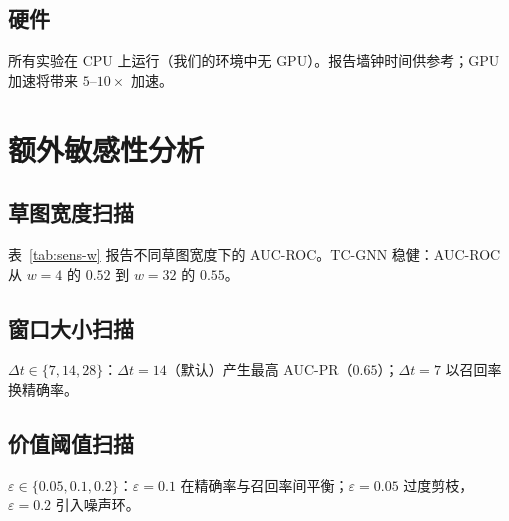 \documentclass[journal,onecolumn]{IEEEtran}
\newcommand{\eps}{\varepsilon}
\begin{document}
\subsection{硬件}

所有实验在 CPU 上运行（我们的环境中无 GPU）。报告墙钟时间供参考；GPU 加速将带来 $5$--$10\times$ 加速。

\section{额外敏感性分析}
\label{sec:appx-extra}

\subsection{草图宽度扫描}

表~\ref{tab:sens-w} 报告不同草图宽度下的 AUC-ROC。TC-GNN 稳健：AUC-ROC 从 $w=4$ 的 $0.52$ 到 $w=32$ 的 $0.55$。

\subsection{窗口大小扫描}

$\Delta t \in \{7, 14, 28\}$：$\Delta t = 14$（默认）产生最高 AUC-PR（$0.65$）；$\Delta t = 7$ 以召回率换精确率。

\subsection{价值阈值扫描}

$\eps \in \{0.05, 0.1, 0.2\}$：$\eps = 0.1$ 在精确率与召回率间平衡；$\eps = 0.05$ 过度剪枝，$\eps = 0.2$ 引入噪声环。
\end{document}
